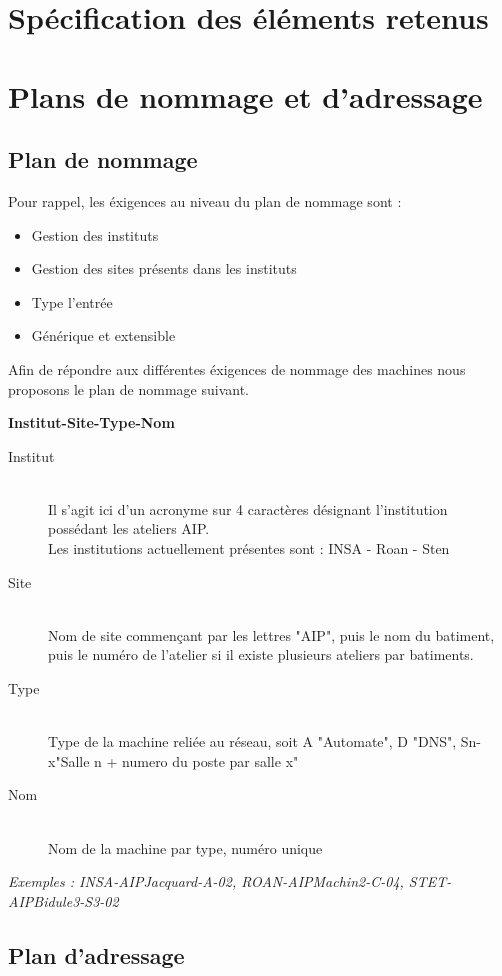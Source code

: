 \documentclass[a4paper]{article}
\begin{document}
\section{Spécification des éléments retenus}

	
\section{Plans de nommage et d'adressage}
	\subsection{Plan de nommage}

	Pour rappel, les éxigences au niveau du plan de nommage sont :\\
	\begin{itemize}
	\item Gestion des instituts
	\item Gestion des sites présents dans les instituts
	\item Type l'entrée
	\item Générique et extensible
	\end{itemize}	

	Afin de répondre aux différentes éxigences de nommage des machines nous proposons le plan de nommage suivant.	
	
	\textbf{Institut-Site-Type-Nom}	
	
	\begin{description}
	\item[Institut]\hfill\\
	Il s'agit ici d'un acronyme sur 4 caractères désignant l'institution possédant les ateliers AIP.\\
	Les institutions actuellement présentes sont :  INSA - Roan - Sten
	
	\item[Site]\hfill\\
	Nom de site commençant par les lettres "AIP", puis le nom du batiment, puis le numéro de l'atelier si il existe plusieurs ateliers par batiments.
	
	\item[Type]\hfill\\
	Type de la machine reliée au réseau, soit A "Automate", D "DNS", Sn-x"Salle n + numero du poste par salle x"	
	
	\item[Nom]\hfill\\
	Nom de la machine par type, numéro unique	
	\end{description}	
	
	\textit{Exemples : INSA-AIPJacquard-A-02, ROAN-AIPMachin2-C-04, STET-AIPBidule3-S3-02}	
	

	\subsection{Plan d'adressage}

	
\end{document}
